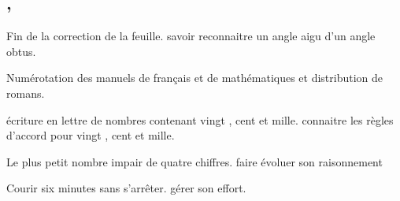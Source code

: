 \documentclass{article}
\begin{document}
	
	\subsection{ \sep}
	\Dis\cma{} Fin de la correction de la feuille.
	\obj savoir reconnaitre un angle aigu d’un angle obtus.
	
	\dIs\cfr{} Numérotation des manuels de français et de mathématiques et distribution de romans.
	
	\dIs\cma{}
	\Ard écriture en lettre de nombres contenant \og vingt \fg{}, \og cent \fg{} et \og mille\fg{}.
	\obj connaitre les règles d’accord pour \og vingt \fg{}, \og cent \fg{} et \og mille\fg{}.
	
	\dIs\cma{} Le plus petit nombre impair de quatre chiffres.
	\obj faire évoluer son raisonnement
	
	\dIs\csp{} Courir six minutes sans s’arrêter.
	\obj gérer son effort.
	
	
	
	
	
	
	\setlength{\parskip}{0ex}
	\tableofcontents
\end{document}
